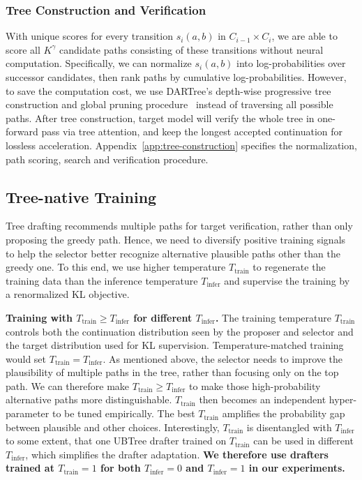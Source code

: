 \subsubsection{Tree Construction and Verification}
\label{sec:method-tree}

With unique scores for every transition $s_i(a,b)$ in $C_{i-1}\times C_i$, we are able to score all $K^\gamma$ candidate paths consisting of these transitions without neural computation. Specifically, we can normalize $s_i(a,b)$ into log-probabilities over successor candidates, then rank paths by cumulative log-probabilities. However, to save the computation cost, we use DARTree's depth-wise progressive tree construction and global pruning procedure~\citep{li2026dartree} instead of traversing all possible paths. After tree construction, target model will verify the whole tree in one-forward pass via tree attention, and keep the longest accepted continuation for lossless acceleration. Appendix~\ref{app:tree-construction} specifies the normalization, path scoring, search and verification procedure.

\subsection{Tree-native Training}
\label{sec:method-training}
Tree drafting recommends multiple paths for target verification, rather than only proposing the greedy path. Hence, we need to diversify positive training signals to help the selector better recognize alternative plausible paths other than the greedy one. To this end, we use higher temperature $T_{\mathrm{train}}$ to regenerate the training data than the inference temperature $T_{\mathrm{infer}}$ and supervise the training by a renormalized KL objective.

\noindent\textbf{Training with $T_{\mathrm{train}}\ge T_{\mathrm{infer}}$ for different $T_{\mathrm{infer}}$.}
The training temperature $T_{\mathrm{train}}$ controls both the continuation distribution seen by the proposer and selector and the target distribution used for KL supervision. Temperature-matched training would set $T_{\mathrm{train}}=T_{\mathrm{infer}}$. As mentioned above, the selector needs to improve the plausibility of multiple paths in the tree, rather than focusing only on the top path. We can therefore make $T_{\mathrm{train}}\ge T_{\mathrm{infer}}$ to make those high-probability alternative paths more distinguishable. $T_{\mathrm{train}}$ then becomes an independent hyper-parameter to be tuned empirically. The best $T_{\mathrm{train}}$ amplifies the probability gap between plausible and other choices. Interestingly, $T_{\mathrm{train}}$ is disentangled with $T_{\mathrm{infer}}$ to some extent, that one UBTree drafter trained on $T_{\mathrm{train}}$ can be used in different $T_{\mathrm{infer}}$, which simplifies the drafter adaptation. \textbf{We therefore use drafters trained at $T_{\mathrm{train}}=1$ for both $T_{\mathrm{infer}}=0$ and $T_{\mathrm{infer}}=1$ in our experiments.}

